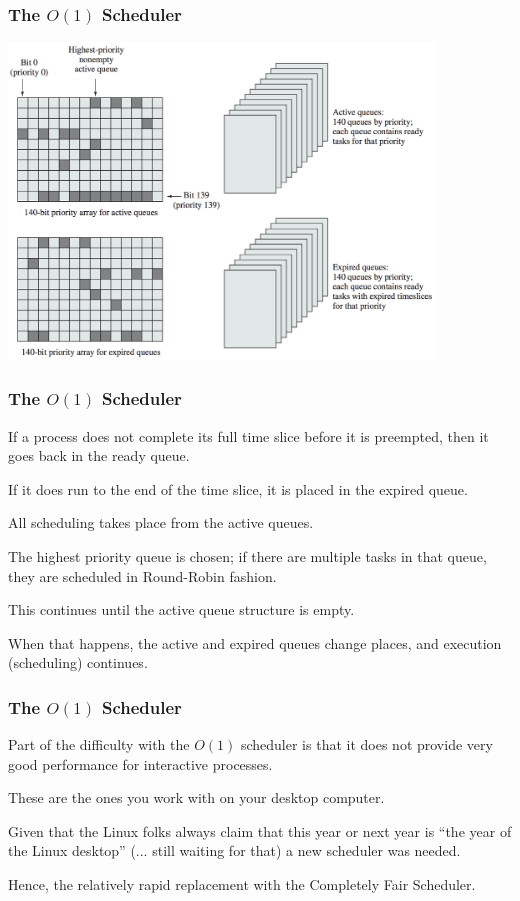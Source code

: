 \begin{frame}
\frametitle{The $O(1)$ Scheduler}


\begin{center}
	\includegraphics[width=0.85\textwidth]{images/linux-o1-struct.png}
\end{center}

\end{frame}

\begin{frame}
\frametitle{The $O(1)$ Scheduler}

If a process does not complete its full time slice before it is preempted, then it goes back in the ready queue. 

If it does run to the end of the time slice, it is placed in the expired queue. 

All scheduling takes place from the active queues. 

The highest priority queue is chosen; if there are multiple tasks in that queue, they are scheduled in Round-Robin fashion. 

This continues until the active queue structure is empty. 

When that happens, the active and expired queues change places, and execution (scheduling) continues.


\end{frame}

\begin{frame}
\frametitle{The $O(1)$ Scheduler}

Part of the difficulty with the $O(1)$ scheduler is that it does not provide very good performance for interactive processes.

These are the ones you work with on your desktop computer. 

Given that the Linux folks always claim that this year or next year is ``the year of the Linux desktop'' (... still waiting for that) a new scheduler was needed. 

Hence, the relatively rapid replacement with the Completely Fair Scheduler.

\end{frame}

